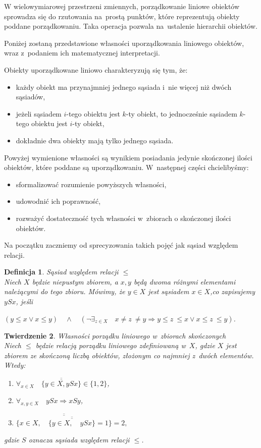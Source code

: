 \documentclass[12pt,a4paper]{report}
\newtheorem{theorem}{Twierdzenie}[section]
\newtheorem{definition}[theorem]{Definicja}
\newcommand{\licznosc}[1]{\overline{\overline{#1}}}
\begin{document}
W wielowymiarowej przestrzeni zmiennych, porządkowanie liniowe obiektów sprowadza się do rzutowania na~prostą punktów, które reprezentują obiekty poddane porządkowaniu.  Taka operacja pozwala na~ustalenie hierarchii obiektów.

Poniżej zostaną przedstawione własności uporządkowania liniowego obiektów, wraz z~podaniem ich matematycznej interpretacji.

Obiekty uporządkowane liniowo charakteryzują się tym, że:
\begin{itemize}
\item każdy obiekt ma przynajmniej jednego sąsiada i~nie więcej niż dwóch sąsiadów,
\item jeżeli sąsiadem $i$-tego obiektu jest $k$-ty obiekt, to jednocześnie sąsiadem $k$-tego obiektu jest $i$-ty obiekt,
\item dokładnie dwa obiekty mają tylko jednego sąsiada.
\end{itemize}


Powyżej wymienione własności są wynikiem posiadania jedynie skończonej ilości obiektów, które poddane są uporządkowaniu. W~następnej części chcielibyśmy:
\begin{itemize}
\item sformalizować rozumienie powyższych własności,
\item udowodnić ich poprawność,
\item rozważyć dostateczność tych własności w~zbiorach o skończonej ilości obiektów.
\end{itemize}


Na początku zaczniemy od sprecyzowania takich pojęć jak sąsiad względem relacji.

\begin{definition}{Sąsiad względem relacji $\leq$}\label{def-sasiada} \\
Niech  $X$ będzie niepustym zbiorem, a $x, y$ będą dwoma różnymi elementami należącymi do tego zbioru. Mówimy, że $y \in X$ jest sąsiadem $x \in X$,co zapisujemy $ySx$, jeśli

$\left(y \leq x \lor x \leq y \right) \quad \land \quad  \left(\lnot \exists_{z \in X}  \quad x\neq z~\neq y \Rightarrow   y \leq z~\leq x \lor x \leq z~\leq y \right)$.
\end{definition}


\begin{theorem}{Własności porządku liniowego w~zbiorach skończonych}\\
Niech $\leq$ będzie relacją porządku liniowego zdefiniowaną w~$X$, gdzie $X$ jest zbiorem ze skończoną liczbą obiektów, złożonym co najmniej z~dwóch elementów. Wtedy:
\begin{enumerate}
\item $\forall_{x \in X} \quad \licznosc{\{y \in X, ySx\}} \in \{1,2\}$,
\item $\forall_{x, y \in X} \quad ySx \Rightarrow xSy $,
\item $\licznosc{\{x \in X, \quad \licznosc{\{y \in X, \quad ySx \}}=1\}}=2,$
\end{enumerate}
gdzie $S$ oznacza sąsiada względem relacji $\leq$.
\end{theorem}
\end{document}
